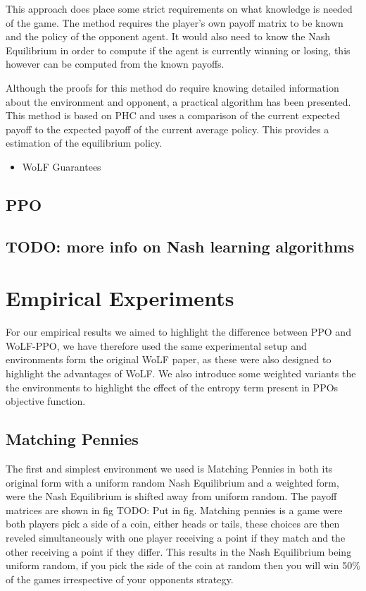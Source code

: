 \documentclass{article}
\newcommand\TODO[1]{{\color{red}TODO: #1}}
\begin{document}
This approach does place some strict requirements on what knowledge is needed of the game. The method requires
the player's own payoff matrix to be known and the policy of the opponent agent. It would also need to know
the Nash Equilibrium in order to compute if the agent is currently winning or losing, this however can be 
computed from the known payoffs.

Although the proofs for this method do require knowing detailed information about the environment and opponent,
a practical algorithm has been presented. This method is based on PHC and uses a comparison of the current expected
payoff to the expected payoff of the current average policy. This provides a estimation of the equilibrium policy.

\begin{itemize}
    \item WoLF Guarantees
\end{itemize}

\subsection{PPO}

\subsection{\TODO{more info on Nash learning algorithms}}

\section{Empirical Experiments}

For our empirical results we aimed to highlight the difference between PPO and WoLF-PPO, we have therefore used the same experimental setup and environments form the original WoLF paper, as these were also designed to highlight the advantages of WoLF. We also introduce some weighted variants the the environments to highlight the effect of the entropy term present in PPOs objective function.

\subsection{Matching Pennies}

The first and simplest environment we used is Matching Pennies in both its original form with a uniform random Nash Equilibrium and a weighted form, were the Nash Equilibrium is shifted away from uniform random. The payoff matrices are shown in fig \TODO{Put in fig}. 
Matching pennies is a game were both players pick a side of a coin, either heads or tails, these choices are then reveled simultaneously with one player receiving a point if they match and the other receiving a point if they differ. This results in the Nash Equilibrium being uniform random, if you pick the side of the coin at random then you will win 50\% of the games irrespective of your opponents strategy.
\end{document}
